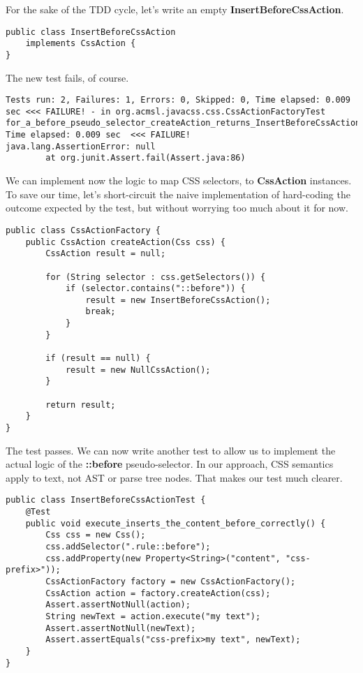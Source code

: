 \documentclass[11pt]{article}
\begin{document}
For the sake of the TDD cycle, let's write an empty \textbf{InsertBeforeCssAction}.

\begin{verbatim}
public class InsertBeforeCssAction
    implements CssAction {
}
\end{verbatim}

The new test fails, of course.

\begin{verbatim}
Tests run: 2, Failures: 1, Errors: 0, Skipped: 0, Time elapsed: 0.009 sec <<< FAILURE! - in org.acmsl.javacss.css.CssActionFactoryTest
for_a_before_pseudo_selector_createAction_returns_InsertBeforeCssAction(org.acmsl.javacss.css.CssActionFactoryTest)  Time elapsed: 0.009 sec  <<< FAILURE!
java.lang.AssertionError: null
        at org.junit.Assert.fail(Assert.java:86)
\end{verbatim}

We can implement now the logic to map CSS selectors, to \textbf{CssAction} instances. To save our time, let's short-circuit the
naive implementation of hard-coding the outcome expected by the test, but without worrying too much about it for now.

\begin{verbatim}
public class CssActionFactory {
    public CssAction createAction(Css css) {
        CssAction result = null;

        for (String selector : css.getSelectors()) {
            if (selector.contains("::before")) {
                result = new InsertBeforeCssAction();
                break;
            }
        }

        if (result == null) {
            result = new NullCssAction();
        }

        return result;
    }
}
\end{verbatim}

The test passes. We can now write another test to allow us to implement the actual logic of the \textbf{::before} pseudo-selector.
In our approach, CSS semantics apply to text, not AST or parse tree nodes. That makes our test much clearer.

\begin{verbatim}
public class InsertBeforeCssActionTest {
    @Test
    public void execute_inserts_the_content_before_correctly() {
        Css css = new Css();
        css.addSelector(".rule::before");
        css.addProperty(new Property<String>("content", "css-prefix>"));
        CssActionFactory factory = new CssActionFactory();
        CssAction action = factory.createAction(css);
        Assert.assertNotNull(action);
        String newText = action.execute("my text");
        Assert.assertNotNull(newText);
        Assert.assertEquals("css-prefix>my text", newText);
    }
}
\end{verbatim}
\end{document}
